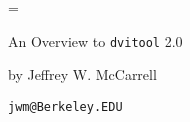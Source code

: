 %
% 
%
%
%
%
%
%
%
%
%
%
%
\def\oidx#1{#1}%
%
\def\item{\vskip .4ex$\bullet$\hskip 1em}%
\def\showit#1{\vskip .6ex\centerline{#1}\vskip .8ex}
\def\section#1{\vskip 1ex\begingroup\bf #1\hskip .7em\endgroup}
\def\dtl{\begingroup\tt dvitool\endgroup}%
\def\Dtl{\begingroup\tt Dvitool\endgroup}%
\def\DVI{\begingroup\tt DVI\endgroup}%
\def\\{\char92}%
\def\{{\char123 }%
\def\}{\char125 }%
\def\~{\char126 }%
\def\^{\char94 }%
%
\magnification=
\centerline{An Overview to {\tt dvitool} 2.0}
\centerline{by Jeffrey W. McCarrell}
\centerline{\tt jwm@Berkeley.EDU}
\vskip 24pt

